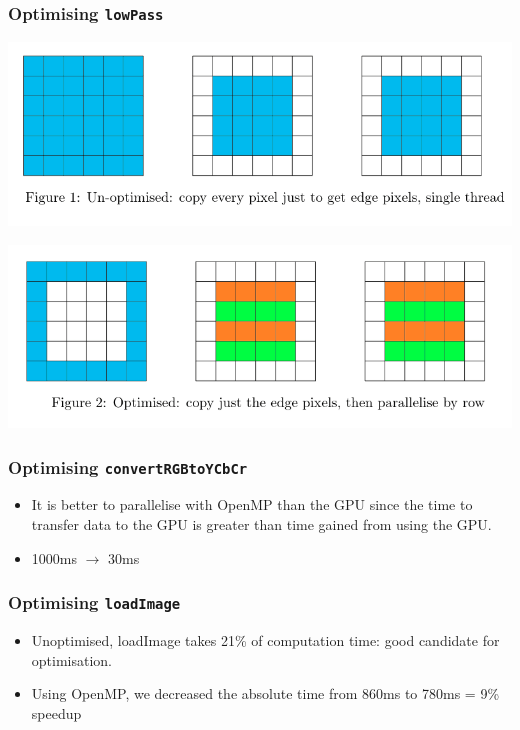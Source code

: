 \begin{frame}
  \frametitle{Optimising \lstinline{lowPass}}
  \begin{center}
          \includegraphics[width=.8\textwidth]{lowPassUnoptimised.png}
  \end{center}
  \begin{center}
            \includegraphics[width=.8\textwidth]{lowPassOptimised.png}
  \end{center}

\end{frame}

\begin{frame}
  \frametitle{Optimising \lstinline{convertRGBtoYCbCr}}
  \begin{itemize}
    \item It is better to parallelise with OpenMP than the GPU since the time to transfer data to the GPU is greater than time gained from using the GPU.
    \item 1000ms $\to$ 30ms
  \end{itemize}
  
  \begin{exampleblock}{}
    
  \end{exampleblock}

\end{frame}



\begin{frame}
  \frametitle{Optimising \lstinline{loadImage}}
    \begin{itemize}
        \item Unoptimised, loadImage takes 21\% of computation time: good candidate for optimisation.
        \item Using OpenMP, we decreased the absolute time from 860ms to 780ms = 9\% speedup
    \end{itemize}
    \begin{exampleblock}{}
        
    \end{exampleblock}

\end{frame}


